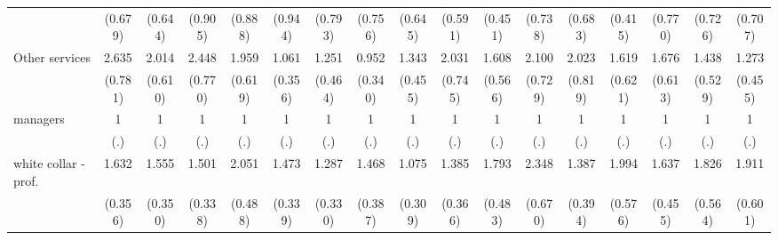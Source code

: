 {\begin{tabular}{l*{16}{c}}
                    &     (0.679)         &     (0.644)         &     (0.905)         &     (0.888)         &     (0.944)         &     (0.793)         &     (0.756)         &     (0.645)         &     (0.591)         &     (0.451)         &     (0.738)         &     (0.683)         &     (0.415)         &     (0.770)         &     (0.726)         &     (0.707)         \\
[1em]
Other services      &       2.635\sym{**} &       2.014\sym{*}  &       2.448\sym{**} &       1.959\sym{*}  &       1.061         &       1.251         &       0.952         &       1.343         &       2.031         &       1.608         &       2.100\sym{*}  &       2.023         &       1.619         &       1.676         &       1.438         &       1.273         \\
                    &     (0.781)         &     (0.610)         &     (0.770)         &     (0.619)         &     (0.356)         &     (0.464)         &     (0.340)         &     (0.455)         &     (0.745)         &     (0.566)         &     (0.729)         &     (0.819)         &     (0.621)         &     (0.613)         &     (0.529)         &     (0.455)         \\
[1em]
managers            &           1         &           1         &           1         &           1         &           1         &           1         &           1         &           1         &           1         &           1         &           1         &           1         &           1         &           1         &           1         &           1         \\
                    &         (.)         &         (.)         &         (.)         &         (.)         &         (.)         &         (.)         &         (.)         &         (.)         &         (.)         &         (.)         &         (.)         &         (.)         &         (.)         &         (.)         &         (.)         &         (.)         \\
[1em]
white collar - prof.&       1.632\sym{*}  &       1.555\sym{*}  &       1.501         &       2.051\sym{**} &       1.473         &       1.287         &       1.468         &       1.075         &       1.385         &       1.793\sym{*}  &       2.348\sym{**} &       1.387         &       1.994\sym{*}  &       1.637         &       1.826         &       1.911\sym{*}  \\
                    &     (0.356)         &     (0.350)         &     (0.338)         &     (0.488)         &     (0.339)         &     (0.330)         &     (0.387)         &     (0.309)         &     (0.366)         &     (0.483)         &     (0.670)         &     (0.394)         &     (0.576)         &     (0.455)         &     (0.564)         &     (0.601)         \\

\end{tabular}}
